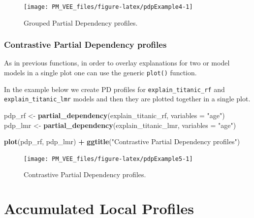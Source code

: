 \documentclass[12pt,]{krantz}
\newenvironment{Shaded}{\begin{snugshade}}{\end{snugshade}}
\newcommand{\DataTypeTok}[1]{\textcolor[rgb]{0.13,0.29,0.53}{#1}}
\newcommand{\KeywordTok}[1]{\textcolor[rgb]{0.13,0.29,0.53}{\textbf{#1}}}
\newcommand{\NormalTok}[1]{#1}
\newcommand{\OperatorTok}[1]{\textcolor[rgb]{0.81,0.36,0.00}{\textbf{#1}}}
\newcommand{\StringTok}[1]{\textcolor[rgb]{0.31,0.60,0.02}{#1}}
\begin{document}
\begin{figure}

{\centering \texttt{[image: PM\_VEE\_files/figure-latex/pdpExample4-1]} 

}

\caption{Grouped Partial Dependency profiles.}\label{fig:pdpExample4}
\end{figure}

\hypertarget{contrastive-partial-dependency-profiles-2}{%
\subsubsection{Contrastive Partial Dependency profiles}\label{contrastive-partial-dependency-profiles-2}}

As in previous functions, in order to overlay explanations for two or model models in a single plot one can use the generic \texttt{plot()} function.

In the example below we create PD profiles for \texttt{explain\_titanic\_rf} and \texttt{explain\_titanic\_lmr} models and then they are plotted together in a single plot.

\begin{Shaded}
\begin{Highlighting}[]
\NormalTok{pdp_rf <-}\StringTok{ }\KeywordTok{partial_dependency}\NormalTok{(explain_titanic_rf, }\DataTypeTok{variables =} \StringTok{"age"}\NormalTok{)}
\NormalTok{pdp_lmr <-}\StringTok{ }\KeywordTok{partial_dependency}\NormalTok{(explain_titanic_lmr, }\DataTypeTok{variables =} \StringTok{"age"}\NormalTok{)}

\KeywordTok{plot}\NormalTok{(pdp_rf, pdp_lmr) }\OperatorTok{+}
\StringTok{  }\KeywordTok{ggtitle}\NormalTok{(}\StringTok{"Contrastive Partial Dependency profiles"}\NormalTok{) }
\end{Highlighting}
\end{Shaded}

\begin{figure}

{\centering \texttt{[image: PM\_VEE\_files/figure-latex/pdpExample5-1]} 

}

\caption{Contrastive Partial Dependency profiles.}\label{fig:pdpExample5}
\end{figure}

\hypertarget{accumulatedLocalProfiles}{%
\section{Accumulated Local Profiles}\label{accumulatedLocalProfiles}}
\end{document}
